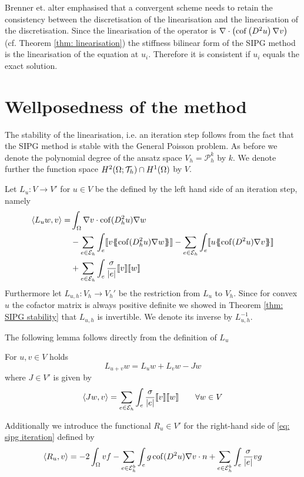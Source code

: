 Brenner et. alter emphasised that a convergent scheme needs to retain the consistency between the discretisation of the linearisation and the linearisation of the discretisation. Since the linearisation of the \MA operator is $\nabla \cdot \left( \operatorname{cof} \left( D^2 u \right) \nabla v \right)$ (cf. Theorem \ref{thm: linearisation}) the stiffness bilinear form of the SIPG method is the linearisation of the \MA equation at $u_i$. Therefore it is consistent if $u_i$ equals the exact solution. 

\section{Wellposedness of the method}

The stability of the linearisation, i.e. an iteration step follows from the fact that the SIPG method is stable with the General Poisson problem. As before we denote the polynomial degree of the ansatz space $V_h=\mathcal P_h^k$ by $k$. We denote further the function space $H^2(\Omega; \mathcal{T}_h) \cap H^1(\Omega)$ by $V$. 

Let $L_u:V \rightarrow V'$ for $u \in V$ be the defined by the left hand side of an iteration step, namely
\begin{align}
	\bilin {L_u w} v =   &\int_{\Omega} \nabla v \cdot \cof(D_h^2 u) \nabla w \nonumber\\
	& -\sum\limits_{e \in \edges}\int_{e} \jump {v \average { \cof(D_h^2 u) \nabla w} }
	- \sum\limits_{e \in \edges}\int_{e} \jump {u \average{ \cof(D^2 u) \nabla v} } \nonumber\\  
	&+\sum\limits_{e \in \edges} \int_e \frac \sigma {|e|} \jump {v}  \jump {w}
\end{align}
Furthermore let $L_{u,h}:V_h \rightarrow V_h'$ be the restriction from $L_u$ to $V_h$. 
Since for convex $u$ the cofactor matrix is always positive definite we showed in Theorem \ref{thm: SIPG stability} that $L_{u,h}$ is invertible. We denote its inverse by $L_{u,h}^{-1}$.

The following lemma follows directly from the definition of $L_u$
\begin{lemma}\label{la: addition L}
	For $u,v \in V$ holds
	\[
		L_{u+v}w = L_{u}w + L_{v}w - Jw
	\]
	where $J \in V'$ is given by
\[
	 \langle Jw, v \rangle = \sum\limits_{e \in \mathcal{E}_h} \int_e \frac \sigma {|e|} \llbracket v \rrbracket  \llbracket w \rrbracket \qquad \forall w \in V
\] 
\end{lemma}

Additionally we introduce the functional $R_u \in V'$ for the right-hand side of \eqref{eq: sipg iteration} defined by
\[
	 \langle R_u, v \rangle = - 2 \int_{\Omega}v f
	-\sum\limits_{e \in \mathcal{E}_h^b}\int_{e} g \operatorname{cof}(D^2 u) \nabla v \cdot n 
	+\sum\limits_{e \in \mathcal{E}_h^b} \int_e \frac \sigma {|e|} v g
\]

